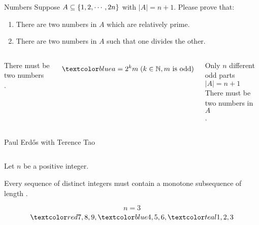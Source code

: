 
\begin{frame}{}
  \begin{exampleblock}{Numbers}
    Suppose $A \subseteq \{1, 2, \cdots, 2n\}$ with $|A| = n + 1$.
    Please prove that:
    \begin{enumerate}[(1)]
      \item There are two numbers in $A$ which are relatively prime.
      \item There are two numbers in $A$ such that one divides the other.
    \end{enumerate}
  \end{exampleblock}

  \vspace{0.50cm}
  \begin{columns}
    \pause
      \begin{center}
	There must be two numbers \\ .
      \end{center}
      \pause
      \[
	\blue{a = 2^{k} m\; (k \in \mathbb{N}, m \text{ is odd})}
      \]
      \pause
      \begin{center}
	Only $n$ different odd parts \\[5pt] \pause
	$|A| = n + 1$ \\[15pt] \pause
	{There must be two numbers in $A$ \\ .}
      \end{center}
  \end{columns}
\end{frame}

\begin{frame}{}
  \begin{columns}
      \pause
      {\centerline{Paul Erd\H{o}s with Terence Tao}}
  \end{columns}
\end{frame}

\begin{frame}{}
  \begin{theorem}
    Let $n$ be a positive integer. 

    Every sequence of  distinct integers must contain a monotone subsequence
    of length .
  \end{theorem}

  \pause
  \begin{center}
  \end{center}

  \pause
  \[
    n = 3
  \]
  \[
    \red{7, 8, 9}, \blue{4, 5, 6}, \teal{1, 2, 3}
  \]
\end{frame}
